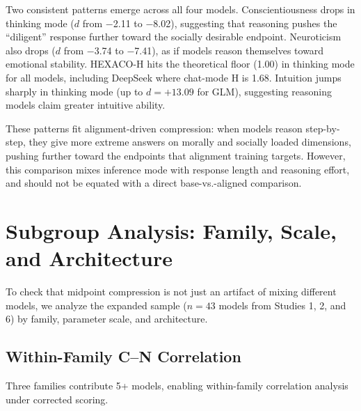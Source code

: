 \documentclass[11pt]{article}
\begin{document}
Two consistent patterns emerge across all four models.
Conscientiousness drops in thinking mode ($d$ from $-$2.11 to $-$8.02), suggesting that reasoning pushes the ``diligent'' response further toward the socially desirable endpoint.
Neuroticism also drops ($d$ from $-$3.74 to $-$7.41), as if models reason themselves toward emotional stability.
HEXACO-H hits the theoretical floor (1.00) in thinking mode for all models, including DeepSeek where chat-mode H is 1.68.
Intuition jumps sharply in thinking mode (up to $d = +13.09$ for GLM), suggesting reasoning models claim greater intuitive ability.

These patterns fit alignment-driven compression: when models reason step-by-step, they give more extreme answers on morally and socially loaded dimensions, pushing further toward the endpoints that alignment training targets.
However, this comparison mixes inference mode with response length and reasoning effort, and should not be equated with a direct base-vs.-aligned comparison.

\section{Subgroup Analysis: Family, Scale, and Architecture}
\label{sec:appendix_subgroup}

To check that midpoint compression is not just an artifact of mixing different models, we analyze the expanded sample ($n = 43$ models from Studies 1, 2, and 6) by family, parameter scale, and architecture.

\subsection{Within-Family C--N Correlation}

Three families contribute 5+ models, enabling within-family correlation analysis under corrected scoring.

\begin{table}[!htb]
\centering
\caption{Within-family C--N correlation and response profile (expanded sample, corrected scoring). Distance = mean absolute deviation from Likert midpoint (3.0) across the 5 BFI dimensions.}
\label{tab:within_family_cn}
\end{table}
\end{document}
